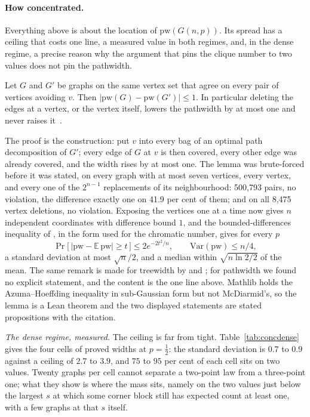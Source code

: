 \paragraph{How concentrated.}
Everything above is about the location of $\mathrm{pw}(G(n,p))$. Its spread
has a ceiling that costs one line, a measured value in both regimes, and, in
the dense regime, a precise reason why the argument that pins the clique
number to two values does not pin the pathwidth.

\begin{lemma}
\label{lem:lipschitz}
Let $G$ and $G'$ be graphs on the same vertex set that agree on every pair
of vertices avoiding $v$. Then $|\mathrm{pw}(G)-\mathrm{pw}(G')|\le1$. In
particular deleting the edges at a vertex, or the vertex itself, lowers the
pathwidth by at most one and never raises it~.
\end{lemma}

The proof is the construction: put $v$ into every bag of an optimal path
decomposition of $G'$; every edge of $G$ at $v$ is then covered, every other
edge was already covered, and the width rises by at most one. The lemma
was brute-forced before it was stated, on every graph with at most seven
vertices, every vertex, and every one of the $2^{n-1}$ replacements of its
neighbourhood: 500,793 pairs, no violation, the difference exactly one on
41.9 per cent of them; and on all 8,475 vertex deletions, no violation.
Exposing the vertices one at a time now gives $n$ independent coordinates
with difference bound $1$, and the bounded-differences inequality of
\citet{McDiarmid1989}, in the form \citet{ShamirSpencer1987} used for the
chromatic number, gives for every $p$
\[
  \Pr\bigl[\,|\mathrm{pw}-\mathbb E\,\mathrm{pw}|\ge t\,\bigr]\le 2e^{-2t^{2}/n},
  \qquad \mathrm{Var}(\mathrm{pw})\le n/4 ,
\]
a standard deviation at most $\sqrt n/2$, and a median within
$\sqrt{n\ln2/2}$ of the mean. The same remark is made for treewidth by
\citet{Gao2012} and \citet{DoErdeKang2024}; for pathwidth we found no
explicit statement, and the content is the one line above. Mathlib holds
the Azuma--Hoeffding inequality in sub-Gaussian form but not McDiarmid's,
so the lemma is a Lean theorem and the two displayed statements are stated
propositions with the citation.

\emph{The dense regime, measured.} The ceiling is far from tight.
Table~\ref{tab:concdense} gives the four cells of proved widths at
$p=\tfrac12$: the standard deviation is $0.7$ to $0.9$ against a ceiling of
$2.7$ to $3.9$, and $75$ to $95$ per cent of each cell sits on two values.
Twenty graphs per cell cannot separate a two-point law from a three-point
one; what they show is where the mass sits, namely on the two values just
below the largest $s$ at which some corner block still has expected count at
least one, with a few graphs at that $s$ itself.

